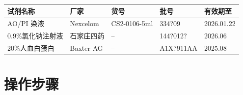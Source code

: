 \documentclass[UTF8,10pt,a4paper,fontset=fandol]{ctexart}
\newcommand{\fieldvalue}[1]{#1}
\newcommand{\handwritten}[1]{#1}
\begin{document}
\begin{tabularx}{\textwidth}{|X|X|X|X|X|}
\hline
试剂名称 & 厂家 & 货号 & 批号 & 有效期至\\
\hline
AO/PI 染液 &
\fieldvalue{Nexcelom} &
\fieldvalue{CS2-0106-5ml} &
\fieldvalue{\handwritten{334?09}} &
\fieldvalue{\handwritten{2026.01.22}}\\
\hline
0.9\%氯化钠注射液 &
\fieldvalue{石家庄四药} &
\fieldvalue{--} &
\fieldvalue{\handwritten{144?012?}} &
\fieldvalue{\handwritten{2026.06}}\\
\hline
20\%人血白蛋白 &
\fieldvalue{Baxter AG} &
\fieldvalue{--} &
\fieldvalue{\handwritten{A1X?911AA}} &
\fieldvalue{\handwritten{2025.08}}\\
\hline
\end{tabularx}

\section{操作步骤}
\end{document}
